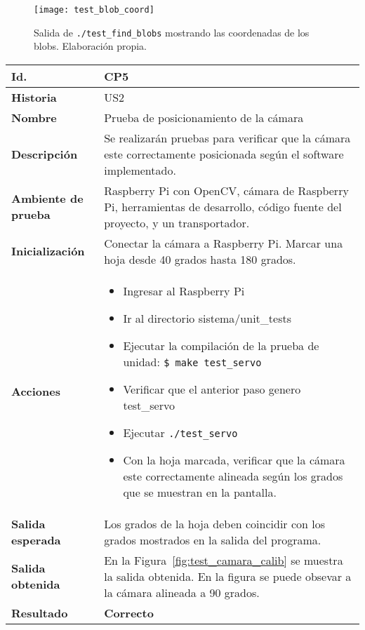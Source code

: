 \begin{figure}
  \centering
    \texttt{[image: test\_blob\_coord]}
  \caption{Salida de \texttt{./test\_find\_blobs} mostrando las coordenadas de los blobs. Elaboración propia.}
  \label{fig:test_blob_coord}
\end{figure}



\begin{longtable}{|l|p{10cm}|}
\hline
\textbf{Id.} & CP5 \\
\hline
\textbf{Historia} & US2\\
\hline
\textbf{Nombre} & Prueba de posicionamiento de la cámara\\
\hline
\textbf{Descripción} & Se realizarán pruebas para verificar que la cámara este correctamente posicionada según el software implementado. \\
\hline
\textbf{Ambiente de prueba} & Raspberry Pi con OpenCV, cámara de Raspberry Pi, herramientas de desarrollo, código fuente del proyecto, y un transportador. \\
\hline
\textbf{Inicialización} & Conectar la cámara a Raspberry Pi. Marcar una hoja desde 40 grados hasta 180 grados.\\
\hline
\textbf{Acciones} &  
\parbox[][][s]{8cm}{ 
            \begin{itemize}
                \item Ingresar al Raspberry Pi
                \item Ir al directorio sistema/unit\_tests
                \item Ejecutar la compilación de la prueba de unidad: \texttt{\$ make test\_servo}
                \item Verificar que el anterior paso genero test\_servo
                \item Ejecutar \texttt{./test\_servo}
                \item Con la hoja marcada, verificar que la cámara este correctamente alineada según los grados que se muestran en la pantalla.
            \end{itemize} 
}
\\
\hline
\textbf{Salida esperada} & Los grados de la hoja deben coincidir con los grados mostrados en la salida del programa.\\
\hline
\textbf{Salida obtenida} & En la Figura~\ref{fig:test_camara_calib} se muestra la salida obtenida. En la figura se puede obsevar a la cámara alineada a 90 grados.\\
\hline
\textbf{Resultado} & \textbf{Correcto}\\
\hline
\end{longtable}

